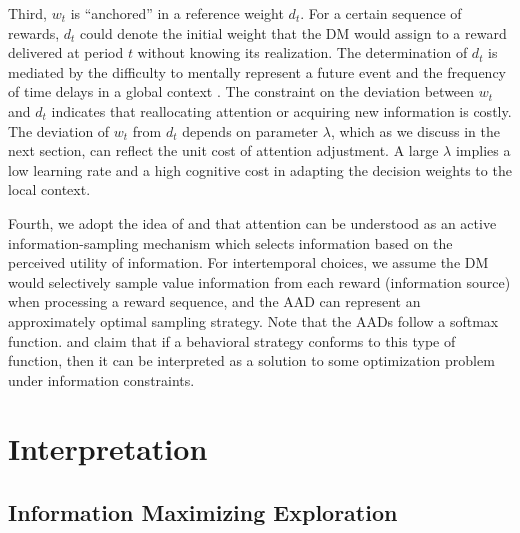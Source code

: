 \documentclass[
  12pt,
]{article}
\begin{document}
Third, \(w_t\) is ``anchored'' in a reference weight \(d_t\). For a
certain sequence of rewards, \(d_t\) could denote the initial weight
that the DM would assign to a reward delivered at period \(t\) without
knowing its realization. The determination of \(d_t\) is mediated by the
difficulty to mentally represent a future event
\citep{trope2003temporal} and the frequency of time delays in a global
context \citep{stewart2006decision}. The constraint on the deviation
between \(w_t\) and \(d_t\) indicates that reallocating attention or
acquiring new information is costly. The deviation of \(w_t\) from
\(d_t\) depends on parameter \(\lambda\), which as we discuss in the
next section, can reflect the unit cost of attention adjustment. A large
\(\lambda\) implies a low learning rate and a high cognitive cost in
adapting the decision weights to the local context.

Fourth, we adopt the idea of \citet{gottlieb2012attention} and
\citet{gottlieb2013information} that attention can be understood as an
active information-sampling mechanism which selects information based on
the perceived utility of information. For intertemporal choices, we
assume the DM would selectively sample value information from each
reward (information source) when processing a reward sequence, and the
AAD can represent an approximately optimal sampling strategy. Note that
the AADs follow a softmax function. \citet{matvejka2015rational} and
\citet{mackowiak2023rational} claim that if a behavioral strategy
conforms to this type of function, then it can be interpreted as a
solution to some optimization problem under information constraints.

\hypertarget{interpretation}{%
\section{Interpretation}\label{interpretation}}

\hypertarget{information-maximizing-exploration}{%
\subsection{\texorpdfstring{Information Maximizing Exploration
\label{info_exploration}}{Information Maximizing Exploration }}\label{information-maximizing-exploration}}
\end{document}
